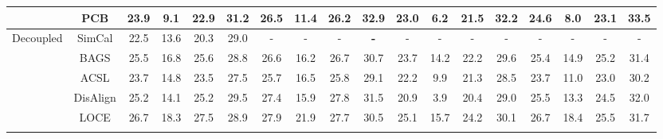 \documentclass[lettersize,journal]{IEEEtran}
\begin{document}
\begin{table*}[t]
{\begin{tabular}{c|c|cccccccc|cccccccc}
                                     & PCB\cite{he2022relieving}                      & 23.9          & 9.1           & 22.9          & \multicolumn{1}{c|}{\textbf{31.2}} & 26.5          & 11.4          & 26.2          & \textbf{32.9} & \multicolumn{1}{c|}{23.0}          & 6.2           & 21.5          & \multicolumn{1}{c|}{\textbf{32.2}} & \multicolumn{1}{c|}{24.6}          & 8.0           & 23.1          & \textbf{33.5} \\ \hline\hline
        \multirow{6}{*}{Decoupled}   & SimCal\cite{wang2020devil}                   & 22.5          & 13.6          & 20.3          & \multicolumn{1}{c|}{29.0}          & -             & -             & -             & \textbf{-}    & \multicolumn{1}{c|}{-}             & -             & -             & \multicolumn{1}{c|}{-}             & \multicolumn{1}{c|}{-}             & -             & -             & -             \\
                                     & BAGS\cite{li2020overcoming}                     & 25.5          & 16.8          & 25.6          & \multicolumn{1}{c|}{28.8}          & 26.6          & 16.2          & 26.7          & 30.7          & \multicolumn{1}{c|}{23.7}          & 14.2          & 22.2          & \multicolumn{1}{c|}{29.6}          & \multicolumn{1}{c|}{25.4}          & 14.9          & 25.2          & 31.4          \\
                                     & ACSL\cite{wang2021adaptive}                     & 23.7          & 14.8          & 23.5          & \multicolumn{1}{c|}{27.5}          & 25.7          & 16.5          & 25.8          & 29.1          & \multicolumn{1}{c|}{22.2}          & 9.9           & 21.3          & \multicolumn{1}{c|}{28.5}          & \multicolumn{1}{c|}{23.7}          & 11.0          & 23.0          & 30.2          \\
                                     & DisAlign\cite{zhang2021distribution}                 & 25.2          & 14.1          & 25.2          & \multicolumn{1}{c|}{29.5}          & 27.4          & 15.9          & 27.8          & 31.5          & \multicolumn{1}{c|}{20.9}          & 3.9           & 20.4          & \multicolumn{1}{c|}{29.0}          & \multicolumn{1}{c|}{25.5}          & 13.3          & 24.5          & 32.0          \\
                                     & LOCE\cite{feng2021exploring}                     & 26.7          & 18.3          & 27.5          & \multicolumn{1}{c|}{28.9}          & 27.9          & 21.9          & 27.7          & 30.5          & \multicolumn{1}{c|}{25.1}          & 15.7          & 24.2          & \multicolumn{1}{c|}{30.1}          & \multicolumn{1}{c|}{26.7}          & 18.4          & 25.5          & 31.7          \\\cline{2-18}

\end{tabular}}
\end{table*}
\end{document}
